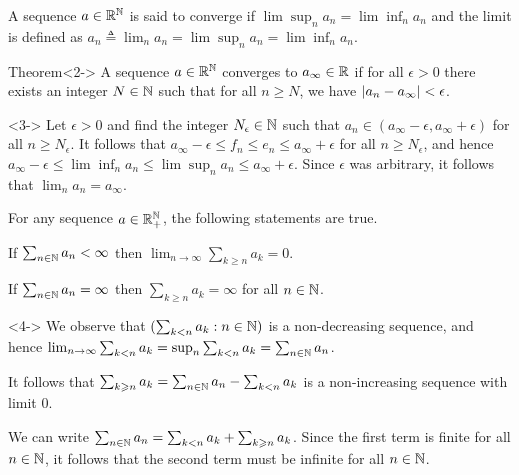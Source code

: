 \documentclass[12pt,aspectratio=169]{beamer}
\begin{document}
\begin{frame}
\begin{Definition} 
A sequence $a \in \mathbb{R}^{\mathbb{N}}$ is said to converge if $\lim\sup_n a_n = \lim\inf_n a_n$ and the limit is defined as $a_n \triangleq \lim_n a_n = \lim\sup_n a_n = \lim\inf_n a_n. $
\end{Definition}

\begin{block}{Theorem}<2-> 
A sequence $a \in \mathbb{R}^{\mathbb{N}}$ converges to $a_\infty \in \mathbb{R}$ if for all $\epsilon > 0$ there exists an integer $N \in \mathbb{N}$ such that for all $n \ge N$, we have $\left\lvert a_n-a_\infty\right\rvert < \epsilon$. 
\end{block}
\begin{Proof}<3->
Let $\epsilon > 0$ and find the integer $N_\epsilon \in \mathbb{N}$ such that $a_n \in (a_\infty-\epsilon, a_\infty+\epsilon)$ for all $n \ge N_\epsilon$. 
It follows that $a_\infty-\epsilon \le f_n \le e_n \le a_\infty+\epsilon$ for all $n \ge N_\epsilon$, 
and hence $a_\infty-\epsilon \le \lim\inf_n a_n \le \lim\sup_n a_n \le a_\infty+\epsilon.$ 
Since $\epsilon$ was arbitrary, it follows that $\lim_na_n = a_\infty$.
\end{Proof}
\end{frame}
\begin{frame}
\begin{prop}
For any sequence $a \in \mathbb{R}_+^{\mathbb{N}}$, the following statements are true.
\begin{compactenum}[(i)]
\item<2-> If $\sum_{n\in\mathbb{N}}a_n < \infty$ then $\lim_{n \to \infty}\sum_{k \ge n}a_k = 0$.
\item<3-> If $\sum_{n\in\mathbb{N}}a_n = \infty$ then $\sum_{k \ge n}a_k = \infty$ for all $n \in \mathbb{N}$.
\end{compactenum}
\end{prop}
\begin{Proof}<4->
We observe that $(\sum_{k < n}a_k: n \in\mathbb{N})$ is a non-decreasing sequence, and hence $\lim_{n \to \infty}\sum_{k < n}a_k = \sup_n\sum_{k< n}a_k = \sum_{n \in \mathbb{N}}a_n$. 
\begin{compactenum}[(i)] 
\item<5-> It follows that $\sum_{k \geqslant n}a_k = \sum_{n \in \mathbb{N}}a_n - \sum_{k < n}a_k$ is a non-increasing sequence with limit $0$. 
\item<6-> We can write $\sum_{n \in \mathbb{N}}a_n = \sum_{k < n}a_k + \sum_{k \geqslant n}a_k$. 
Since the first term is finite for all $n \in \mathbb{N}$, it follows that the second term must be infinite for all $n \in \mathbb{N}$. 
\end{compactenum}
\end{Proof}
\end{frame}
\end{document}
